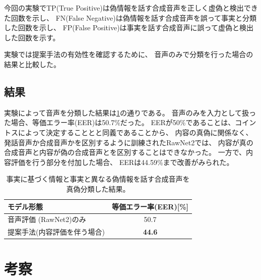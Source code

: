 今回の実験でTP(True Positive)は偽情報を話す合成音声を正しく虚偽と検出できた回数を示し、
FN(False Negative)は偽情報を話す合成音声を誤って事実と分類した回数を示し、
FP(False Positive)は事実を話す合成音声に誤って虚偽と検出した回数を示す。

実験では提案手法の有効性を確認するために、
音声のみで分類を行った場合の結果と比較した。

\subsection{結果}\label{sec:cnt_res}
実験によって音声を分類した結果は\cref{tb:result}の通りである。
音声のみを入力として扱った場合、等価エラー率(EER)は50.7\%だった。
EERが50\%であることは、コイントスによって決定することとと同義であることから、
内容の真偽に関係なく、発話音声か合成音声かを区別するように訓練されたRawNet2では、
内容が真の合成音声と内容が偽の合成音声とを区別することはできなかった。
一方で、内容評価を行う部分を付加した場合、
EERは44.59\%まで改善がみられた。

\begin{table}[h]
    \caption{事実に基づく情報と事実と異なる偽情報を話す合成音声を真偽分類した結果。}
    \centering
    \begin{tabular}{l|c}\hline
       モデル形態 & 等価エラー率(EER)[\%] \\\hline\hline
       音声評価 (RawNet2)のみ & 50.7\\
       提案手法(内容評価を伴う場合) & \textbf{44.6}\\\hline
    \end{tabular}
    \label{tb:result}
\end{table}

\section{考察}\label{sec:cnt_evl}

